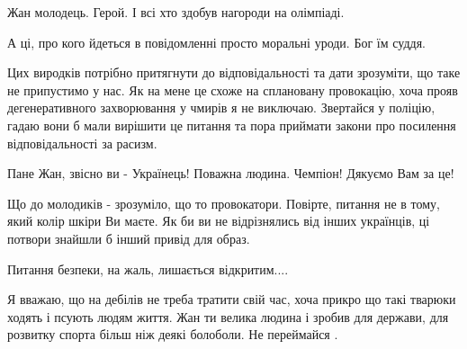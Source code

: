 \begin{itemize}
 

Жан молодець. Герой. І всі хто здобув нагороди на олімпіаді.

А ці, про кого йдеться в повідомленні просто моральні уроди. Бог їм суддя.

 

Цих виродків потрібно притягнути до відповідальності та дати зрозуміти, що таке
не припустимо у нас. Як на мене це схоже на сплановану провокацію, хоча прояв
дегенеративного захворювання у чмирів я не виключаю. Звертайся у поліцію, гадаю
вони б мали вирішити це питання та пора приймати закони про посилення
відповідальності за расизм.


 

Пане Жан, звісно ви - Українець! Поважна людина. Чемпіон! Дякуємо Вам за це!

Що до молодиків - зрозуміло, що то провокатори. Повірте, питання не в тому,
який колір шкіри Ви маєте. Як би ви не відрізнялись від інших українців, ці
потвори знайшли б інший привід для образ.

Питання безпеки, на жаль, лишається відкритим....

 

Я вважаю, що на дебілів не треба тратити свій час, хоча прикро що такі тварюки
ходять і псують людям життя. Жан ти велика людина і зробив для держави, для
розвитку спорта більш ніж деякі болоболи. Не переймайся .


 


\end{itemize}
